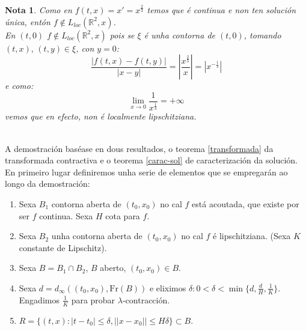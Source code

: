 \documentclass[11pt, a4paper,twoside]{article}
\makeatletter
\theoremstyle{theorem-style}  %
\renewenvironment{proof}[1][\proofname]{\par
	\pushQED{\qed}%
	\normalfont \topsep6\p@\@plus6\p@\relax
	\list{}{%
		\settowidth{\leftmargin}{\quad:\hskip\labelsep}%
		\setlength{\labelwidth}{0pt}%
		\setlength{\itemindent}{-\leftmargin}%
	}%
	\item[\hskip\labelsep\itshape#1\@addpunct{:}]\ignorespaces
}{%
	\popQED\endlist\@endpefalse
}
\theoremstyle{definition-style}
\newtheorem*{note}{Nota} %
\theoremstyle{example-style}
\providecommand{\abs}[1]{\left\lvert#1\right\rvert} %
\makeatother
\begin{document}
\begin{note}
	Como en $f(t, x) = x' = x^{\frac{2}{3}}$ temos que é continua e non ten solución única, entón $f \notin L_{loc}(\mathbb{R}^2,x)$. \\
	En $(t, 0)$ $f \notin L_{loc}(\mathbb{R}^2,x)$ pois se $\xi$ é unha contorna de $(t, 0)$, tomando $(t, x), \, (t, y) \in \xi$, con $y=0$:
	\[\frac{\abs{f(t, x) - f(t, y)}}{\abs{x - y}} = \abs{\frac{x^{\frac{2}{3}}}{x}} = \abs{x^{-\frac{1}{3}}}\]
	e como:
	\[\lim\limits_{x \to 0} \frac{1}{x^{\frac{1}{3}}} = +\infty\] 
	vemos que en efecto, non é localmente lipschitziana.
\end{note}
\begin{proof}\ \\
	A demostración baséase en dous resultados, o teorema \ref{transformada} da transformada contractiva e o teorema \ref{carac-sol} de caracterización da solución. En primeiro lugar definiremos unha serie de elementos que se empregarán ao longo da demostración:
	\begin{enumerate}
		\item Sexa $ B_1 $  contorna aberta de $ (t_0,x_0) $ no cal $ f $ está acoutada, que existe por ser $ f $ continua. Sexa $ H $ cota para $ f $.
		
		\item Sexa $ B_2 $ unha contorna aberta de $ (t_0,x_0) $ no cal $ f $ é lipschitziana. (Sexa $ K $ constante de Lipschitz).
		
		\item Sexa $ B=B_1 \cap B_2 $, $ B $ aberto, $ (t_0,x_0) \in B$.
		
		\item Sexa $ d=d_\infty((t_0,x_0),\text{Fr}(B)) $ e eliximos $ \delta : 0<\delta <\min \{d,\frac{d}{H},\frac{1}{K}\} $. Engadimos $ \frac{1}{K} $ para probar $ \lambda $-contracción.
		\item  $ R=\{(t,x) : |t-t_0|\leq \delta, ||x-x_0||\leq H\delta \}\subset B $.
	\end{enumerate}
	

\end{proof}
\end{document}
